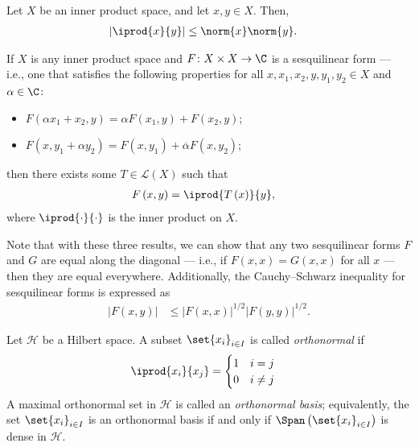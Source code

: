 \begin{theorem}
  Let $X$ be an inner product space, and let $x,y\in X$. Then,
  \begin{align*}
    \left\vert \iprod{x}{y} \right\vert &\leq \norm{x}\norm{y}.
  \end{align*}
\end{theorem}
\begin{lemma}
  If $X$ is any inner product space and $F\colon X\times X \rightarrow \C$ is a sesquilinear form --- i.e., one that satisfies the following properties for all $x,x_1,x_2,y,y_1,y_2\in X$ and $\alpha\in\C$:
  \begin{itemize}
    \item $F\left(\alpha x_1+x_2,y\right) = \alpha F\left(x_1,y\right) + F\left(x_2,y\right)$;
    \item $F\left(x,y_1 + \alpha y_2\right) = F\left(x,y_1\right) + \overline{\alpha}F\left(x,y_2\right)$;
  \end{itemize}
  then there exists some $T\in \mathcal{L}\left(X\right)$ such that
  \begin{align*}
    F\left(x,y\right) &= \iprod{T\left(x\right)}{y},
  \end{align*}
  where $ \iprod{\cdot}{\cdot} $ is the inner product on $X$.
\end{lemma}
\begin{remark}
Note that with these three results, we can show that any two sesquilinear forms $F$ and $G$ are equal along the diagonal --- i.e., if $F(x,x) = G(x,x)$ for all $x$ --- then they are equal everywhere. Additionally, the Cauchy--Schwarz inequality for sesquilinear forms is expressed as
\begin{align*}
  \left\vert F\left(x,y\right) \right\vert &\leq \left\vert F\left(x,x\right) \right\vert^{1/2}\left\vert F\left(y,y\right) \right\vert^{1/2}.
\end{align*}

\end{remark}
\begin{definition}
  Let $\mathcal{H}$ be a Hilbert space. A subset $\set{x_i}_{i\in I}$ is called \textit{orthonormal} if 
  \begin{align*}
    \iprod{x_i}{x_j} &= \begin{cases}
      1 & i=j\\
      0 & i\neq j
    \end{cases}
  \end{align*}
  A maximal orthonormal set in $\mathcal{H}$ is called an \textit{orthonormal basis}; equivalently, the set $\set{x_i}_{i\in I}$ is an orthonormal basis if and only if $\Span\left(\set{x_i}_{i\in I}\right)$ is dense in $\mathcal{H}$.
\end{definition}
